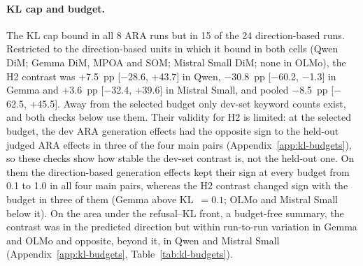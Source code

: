 \paragraph{KL cap and budget.} The KL cap bound in all 8 ARA runs but in 15 of
the 24 direction-based runs. Restricted to the direction-based units in which
it bound in both cells (Qwen DiM; Gemma DiM, MPOA and SOM; Mistral Small DiM;
none in OLMo), the H2 contrast was +7.5~pp [$-$28.6, +43.7] in Qwen,
$-$30.8~pp [$-$60.2, $-$1.3] in Gemma and +3.6~pp [$-$32.4, +39.6] in Mistral
Small, and pooled $-$8.5~pp [$-$62.5, +45.5]. Away from the selected budget
only dev-set keyword counts exist, and both checks below use them. Their
validity for H2 is limited: at the selected budget, the dev ARA generation
effects had the opposite sign to the held-out judged ARA effects in three of
the four main pairs (Appendix~\ref{app:kl-budgets}), so these checks show how
stable the dev-set contrast is, not the held-out one. On them the direction-based generation
effects kept their sign at every budget from 0.1 to 1.0 in all four main
pairs, whereas the H2 contrast changed sign with the budget in three of them
(Gemma above KL~$=0.1$; OLMo and Mistral Small below it). On the area under
the refusal--KL front, a budget-free summary, the contrast was in the
predicted direction but within run-to-run variation in Gemma and OLMo and
opposite, beyond it, in Qwen and Mistral Small (Appendix~\ref{app:kl-budgets},
Table~\ref{tab:kl-budgets}).

